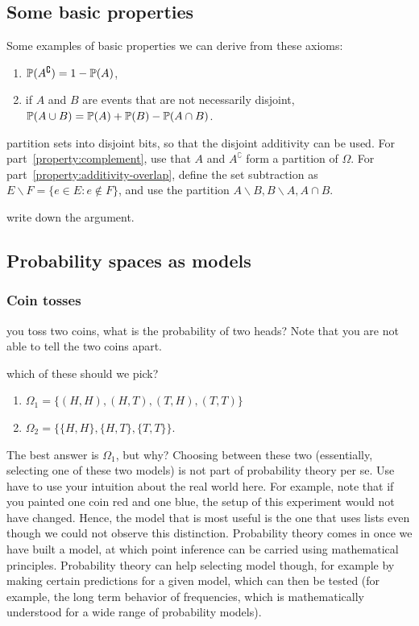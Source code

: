 \documentclass{article}
\begin{document}
\subsection{Some basic properties}\label{sec:basic-properties}

Some examples of basic properties we can derive from these axioms:
\begin{enumerate}
  \item $\P(A^\complement) = 1 - \P(A)$, \label{property:complement}
  \item if $A$ and $B$ are events that are not necessarily disjoint, $\P(A \cup B) = \P(A) + \P(B) - \P(A \cap B)$. \label{property:additivity-overlap}
\end{enumerate}

 partition sets into disjoint bits, so that the disjoint additivity can be used. For part~\ref{property:complement}, use that $A$ and $A^\complement$ form a partition of $\Omega$. For part~\ref{property:additivity-overlap}, define the set subtraction as $E\backslash F = \{e \in E : e \notin F\}$, and use the partition $A\backslash B, B \backslash A, A \cap B$.

 write down the argument.

\subsection{Probability spaces as models}

\subsubsection{Coin tosses}

 you toss two coins, what is the probability of two heads? Note that you are not able to tell the two coins apart.

 which of these should we pick?
\begin{enumerate}
  \item $\Omega_1 = \{(H, H), (H, T), (T, H), (T, T)\}$
  \item $\Omega_2 = \{\{H, H\}, \{H, T\}, \{T, T\}\}$. 
\end{enumerate}

The best answer is $\Omega_1$, but why? Choosing between these two (essentially, selecting one of these two models) is not part of probability theory per se. Use have to use your intuition about the real world here. For example, note that if you painted one coin red and one blue, the setup of this experiment would not have changed. Hence, the model that is most useful is the one that uses lists even though we could not observe this distinction. Probability theory comes in once we have built a model, at which point inference can be carried using mathematical principles. Probability theory can help selecting model though, for example by making certain predictions for a given model, which can then be tested (for example, the long term behavior of frequencies, which is mathematically understood for a wide range of probability models).
\end{document}
